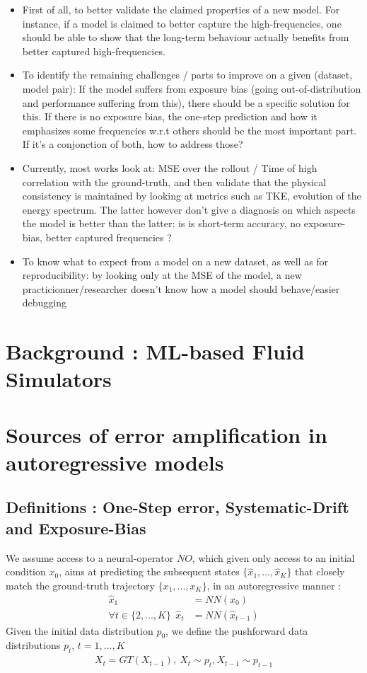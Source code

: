 \documentclass{article}
\begin{document}
\begin{itemize}
    \item First of all, to better validate the claimed properties of a new model. For instance, if a model is claimed to better capture the high-frequencies, one should be able to show that the long-term behaviour actually benefits from better captured high-frequencies.
    \item To identify the remaining challenges / parts to improve on a given (dataset, model pair): If the model suffers from exposure bias (going out-of-distribution and performance suffering from this), there should be a specific solution for this. If there is no exposure bias, the one-step prediction and how it emphasizes some frequencies w.r.t others should be the most important part. If it's a conjonction of both, how to address those?
    \item Currently, most works look at: MSE over the rollout / Time of high correlation with the ground-truth, and then validate that the physical consistency is maintained by looking at metrics such as TKE, evolution of the energy spectrum. The latter however don't give a diagnosis on which aspects the model is better than the latter: is is short-term accuracy, no exposure-bias, better captured frequencies ? 
    \item To know what to expect from a model on a new dataset, as well as for reproducibility: by looking only at the MSE of the model, a new practicionner/researcher doesn't know how a model should behave/easier debugging
\end{itemize}

\section{Background : ML-based Fluid Simulators}

\section{Sources of error amplification in autoregressive models}

\subsection{Definitions : One-Step error, Systematic-Drift and Exposure-Bias}

We assume access to a neural-operator $NO$, which given only access to an initial condition $x_0$, aims at predicting the subsequent states $\{\hat{x}_1, ..., \hat{x}_K\}$ that closely match the ground-truth trajectory $\{x_1, ..., x_K\}$, in an autoregressive manner : 
\begin{align}
    \hat{x}_1 &= NN(x_0)\\
    \forall t \in \{2, ..., K\} \ \ \hat{x}_t &= NN(\hat{x}_{t-1})
\end{align}
Given the initial data distribution $p_0$, we define the pushforward data distributions $p_t$, $t=1,...,K$
\begin{align}
    X_t = GT(X_{t-1}), \ X_{t} \sim p_t, X_{t-1} \sim p_{t-1}
\end{align}
\end{document}
